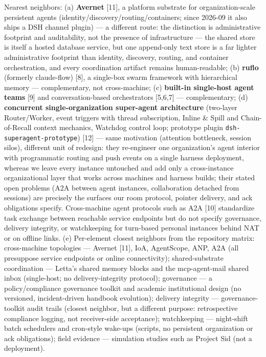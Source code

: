 \documentclass[journal]{IEEEtran}
\begin{document}
Nearest neighbors: (a) \textbf{Avernet} {[}11{]}, a platform substrate
for organization-scale persistent agents
(identity/discovery/routing/containers; since 2026-09 it also ships a
DSH channel plugin) --- a different route: the distinction is
administrative footprint and auditability, not the presence of
infrastructure --- the shared store is itself a hosted database service,
but one append-only text store is a far lighter administrative footprint
than identity, discovery, routing, and container orchestration, and
every coordination artifact remains human-readable; (b) \textbf{ruflo}
(formerly claude-flow) {[}8{]}, a single-box swarm framework with
hierarchical memory --- complementary, not cross-machine; (c)
\textbf{built-in single-host agent teams} {[}9{]} and conversation-based
orchestrators {[}5,6,7{]} --- complementary; (d) \textbf{concurrent
single-organization super-agent architecture} (two-layer Router/Worker,
event triggers with thread subscription, Inline \& Spill and
Chain-of-Recall context mechanics, Watchdog control loop; prototype
plugin \texttt{dsh-superagent-prototype}) {[}12{]} --- same motivation
(attention bottleneck, session silos), different unit of redesign: they
re-engineer one organization's agent interior with programmatic routing
and push events on a single harness deployment, whereas we leave every
instance untouched and add only a cross-instance organizational layer
that works across machines and harness builds; their stated open
problems (A2A between agent instances, collaboration detached from
sessions) are precisely the surfaces our room protocol, pointer
delivery, and ack obligations specify. Cross-machine agent protocols
such as A2A {[}10{]} standardize task exchange between reachable service
endpoints but do not specify governance, delivery integrity, or
watchkeeping for turn-based personal instances behind NAT or on offline
links. (e) Per-element closest neighbors from the repository matrix:
cross-machine topologies --- Avernet {[}11{]}, IoA, AgentScope, ANP, A2A
(all presuppose service endpoints or online connectivity);
shared-substrate coordination --- Letta's shared memory blocks and the
mcp-agent-mail shared inbox (single-host; no delivery-integrity
protocol); governance --- a policy/compliance governance toolkit and
academic institutional design (no versioned, incident-driven handbook
evolution); delivery integrity --- governance-toolkit audit trails
(closest neighbor, but a different purpose: retrospective compliance
logging, not receiver-side acceptance); watchkeeping --- night-shift
batch schedulers and cron-style wake-ups (scripts, no persistent
organization or ack obligations); field evidence --- simulation studies
such as Project Sid (not a deployment).
\end{document}
